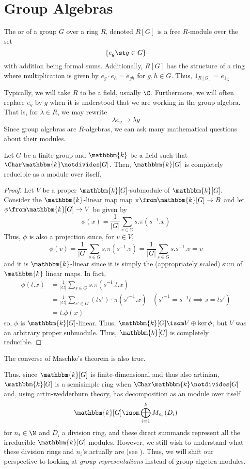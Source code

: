 \documentclass[11pt,leqno,oneside]{amsbook}
\newcommand{\bbk}{\mathbbm{k}}
\numberwithin{thm}{section}
\begin{document}
\section{Group Algebras}
\begin{defn}
  The  or  of a group \(G\) over a ring \(R\), denoted
  \(R[G]\) is a free \(R\)-module over the set \[
    \{e_g \st g \in G\}
  \]
  with addition being formal sums. Additionally, \(R[G]\) has the
  structure of a 
  ring where multiplication is given by \(e_g
  \cdot e_h = e_{gh}\) for \(g,h \in G\). Thus, \(1_{R[G]} = e_{1_G}\)
\end{defn}
Typically, we will take \(R\) to be a field, usually
\(\C\). Furthermore, we will often replace \(e_g\) by \(g\) when it is
understood that we are working in the group algebra. That is, for
\(\lambda \in R\), we may
rewrite \[
  \lambda e_g \to \lambda g 
\]
Since group algebras are \(R\)-algebras, we can ask many mathematical
questions about their modules.
\begin{thm}\label{maschke}
  Let \(G\) be a finite group and \(\bbk\) be a field such that
  \(\Char \bbk \notdivides |G|\). Then, \(\bbk[G]\) is completely
  reducible as a module over itself. 
\end{thm}
\begin{proof}
  Let \(V\) be a proper \(\bbk[G]\)-submodule of \(\bbk[G]\). Consider the
  \(\bbk\)-linear map
  map \(\pi \from \bbk[G] \to B\) and let \(\phi \from \bbk[G] \to V\)
  be given by \[
    \phi(x) = \frac{1}{|G|} \sum_{s \in G} s.\pi(s^{-1}.x)
  \]
  Thus, \(\phi\) is also a projection since, for \(v \in V\), \[
    \phi(v) = \frac{1}{|G|} \sum_{s \in G} s.\pi(s^{-1}.v) =
    \frac{1}{|G|} \sum_{s \in G} s.s^{-1}.v = v
  \]
  and it is \(\bbk\)-linear since it is simply the (appropriately scaled) sum of \(\bbk\)
  linear maps. In fact,
  \begin{align*}
    \phi(t.x) & = \frac{1}{|G|} \sum_{s \in G} s.\pi(s^{-1}.t.x) \\
              & = \frac{1}{|G|} \sum_{s' \in G} (ts') \cdot \pi(s'^{-1}.x)
              & (s'^{-1} = s^{-1}t \implies s = ts') \\
              & = t.\phi(x)
  \end{align*}
  so, \(\phi\) is \(\bbk[G]\)-linear. Thus, \(\bbk[G] \isom V \oplus
  \ker \phi\), but \(V\) was an arbitrary proper submodule. Thus,
  \(\bbk[G]\) is completely reducible.
\end{proof}
\begin{rmk}
  The converse of Maschke's theorem is also true. 
\end{rmk}
Thus, since \(\bbk[G]\) is finite-dimensional and thus also artinian,
\(\bbk[G]\) is a semisimple ring when \(\Char \bbk \notdivides |G|\)
and, using artin-wedderburn theory, 
has decomposition as an module 
over itself \[ 
  \bbk[G] \isom \bigoplus_{i=1}^k M_{n_i}(D_i)
\]
for \(n_i \in \N\) and \(D_i\) a division ring, and these direct
summands represent all the irreducible \(\bbk[G]\)-modules. However,
we still wish to understand what these division rings and \(n_i\)'s
actually are (see \cite{aw}). Thus, we will shift our perspective to looking at
\emph{group representations} instead of group algebra modules.
\end{document}
